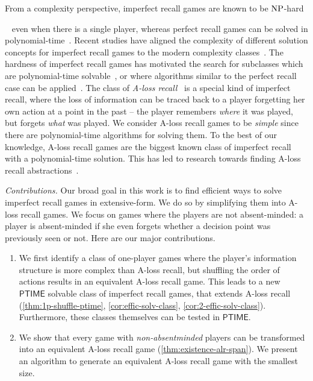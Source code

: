 From a complexity perspective, imperfect recall games are known to be $\operatorname{NP}$-hard

~\cite{KollerMegiddo::1992,Cermak::2018} even when there is a single player, whereas perfect recall games can be solved in polynomial-time~\cite{KollerMegiddo::1992,vonStengel::1996}. Recent studies have aligned the complexity of different solution concepts for imperfect recall games to the modern complexity classes~\cite{GPS20,tewolde-et-al:2023,ijcai2024p332}. The hardness of imperfect recall games has motivated the search for subclasses which are polynomial-time solvable~\cite{kline2002minimum,kaneko1995behavior}, or where algorithms similar to the perfect recall case can be applied~\cite{DBLP:conf/icml/LanctotGBB12,DBLP:conf/sigecom/KroerS16}. The class of \emph{A-loss recall}~\cite{kline2002minimum,kaneko1995behavior} is a special kind of imperfect recall, where the loss of information can be traced back to a player forgetting her own action at a point in the past -- the player remembers \emph{where} it was played, but forgets \emph{what} was played. We consider A-loss recall games to be \emph{simple} since there are polynomial-time algorithms for solving them. To the best of our knowledge, A-loss recall games are the biggest known class of imperfect recall with a polynomial-time solution. This has led to research towards finding A-loss recall abstractions~\cite{Cermak::2018}. 

\emph{Contributions.} Our broad goal in this work is to find efficient ways to solve imperfect recall games in extensive-form. We do so by simplifying them into A-loss recall games. We focus on games where the players are not absent-minded: a player is absent-minded if she even forgets whether a decision point was previously seen or not. Here are our major contributions.
\begin{enumerate}\item We first identify a class of one-player games where the player's information structure is more complex than A-loss recall, but shuffling the order of actions results in an equivalent A-loss recall game. This leads to a new $\mathsf{PTIME}$ solvable class of imperfect recall games, that extends A-loss recall (\cref{thm:1p-shuffle-ptime}, \cref{cor:effic-solv-class}, \cref{cor:2-effic-solv-class}). Furthermore, these classes themselves can be tested in $\mathsf{PTIME}$. 

\item We show that every game with \emph{non-absentminded} players can be transformed into an equivalent A-loss recall game (\cref{thm:existence-alr-span}). We present an algorithm to generate an equivalent A-loss recall game with the smallest size.
\end{enumerate}
















